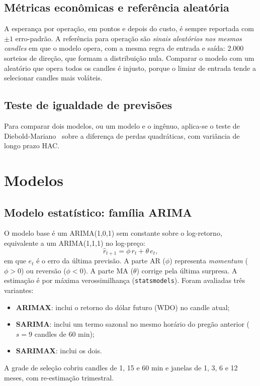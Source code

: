 \documentclass[conference]{IEEEtran}
\begin{document}
\subsection{Métricas econômicas e referência aleatória}

A esperança por operação, em pontos e depois do custo, é sempre reportada com $\pm 1$ erro-padrão. A referência para operação são \emph{sinais aleatórios nos mesmos candles} em que o modelo opera, com a mesma regra de entrada e saída: 2.000 sorteios de direção, que formam a distribuição nula. Comparar o modelo com um aleatório que opera todos os candles é injusto, porque o limiar de entrada tende a selecionar candles mais voláteis.

\subsection{Teste de igualdade de previsões}

Para comparar dois modelos, ou um modelo e o ingênuo, aplica-se o teste de Diebold-Mariano~\cite{diebold1995} sobre a diferença de perdas quadráticas, com variância de longo prazo HAC.

\section{Modelos}

\subsection{Modelo estatístico: família ARIMA}

O modelo base é um ARIMA(1,0,1) sem constante sobre o log-retorno, equivalente a um ARIMA(1,1,1) no log-preço:
\begin{equation}
  \hat r_{t+1} = \phi\, r_t + \theta\, e_t,
  \label{eq:arma}
\end{equation}
em que $e_t$ é o erro da última previsão. A parte AR ($\phi$) representa \emph{momentum} ($\phi>0$) ou reversão ($\phi<0$). A parte MA ($\theta$) corrige pela última surpresa. A estimação é por máxima verossimilhança (\texttt{statsmodels}). Foram avaliadas três variantes:
\begin{itemize}
  \item \textbf{ARIMAX}: inclui o retorno do dólar futuro (WDO) no candle atual;
  \item \textbf{SARIMA}: inclui um termo sazonal no mesmo horário do pregão anterior ($s=9$ candles de 60 min);
  \item \textbf{SARIMAX}: inclui os dois.
\end{itemize}
A grade de seleção cobriu candles de 1, 15 e 60 min e janelas de 1, 3, 6 e 12 meses, com re-estimação trimestral.
\end{document}
